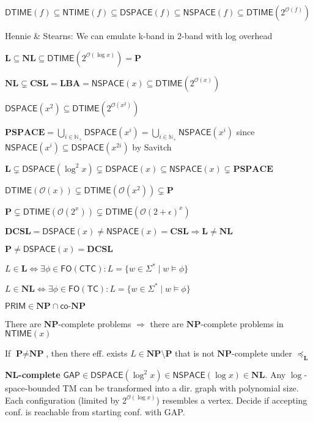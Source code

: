 \documentclass[10pt, twocolumn, parskip=never]{scrartcl}
\newcommand{\fat}[1]{\textbf{#1}}
\newcommand{\newthing}[1]{\fat{\faicon{caret-right} #1}}
\newcommand{\DTIME}[1]{\textsf{DTIME}(#1)}
\newcommand{\NTIME}[1]{\textsf{NTIME}(#1)}
\newcommand{\DSPACE}[1]{\textsf{DSPACE}(#1)}
\newcommand{\NSPACE}[1]{\textsf{NSPACE}(#1)}
\newcommand{\prob}[1]{\textsf{#1}}
\newcommand{\bigO}[1]{\mathcal{O}(#1)}
\newcommand{\reduce}{\preceq}
\newcommand{\lreduce}{\reduce_{\fat{L}}}
\begin{document}
\vfill

$\DTIME{f} \subseteq \NTIME{f} \subseteq \DSPACE{f} \subseteq \NSPACE{f} \subseteq \DTIME{2^{\bigO{f}}}$

Hennie \& Stearns: We can emulate k-band in 2-band with log overhead

$\fat{L} \subseteq \fat{NL} \subseteq \DTIME{2^{\mathcal{O}(\log{x})}} = \fat{P}$

$\fat{NL} \subsetneq \fat{CSL} = \fat{LBA} = \NSPACE{x} \subseteq \DTIME{2^{\mathcal{O}(x)}}$

$\DSPACE{x^2} \subseteq \DTIME{2^{\mathcal{O}(x^2)}}$

$\fat{PSPACE} = \bigcup_{i \in \mathbb{N}_+}{\DSPACE{x^i}} = \bigcup_{i \in \mathbb{N}_+}{\NSPACE{x^i}}$ since $\NSPACE{x^i} \subseteq \DSPACE{x^{2i}}$ by Savitch

$\fat{L} \subsetneq \DSPACE{\log^2{x}} \subsetneq \DSPACE{x} \subseteq \NSPACE{x} \subsetneq \fat{PSPACE}$

$\DTIME{\mathcal{O}(x)} \subsetneq \DTIME{\mathcal{O}(x^2)} \subsetneq \fat{P}$

$\fat{P} \subsetneq \DTIME{\mathcal{O}(2^x)} \subsetneq \DTIME{\mathcal{O}(2 + \epsilon)^x}$

$\fat{DCSL} = \DSPACE{x} \neq \NSPACE{x} = \fat{CSL} \Rightarrow \fat{L} \neq \fat{NL}$

$\fat{P} \neq \DSPACE{x} = \fat{DCSL}$

$L \in \fat{L} \Leftrightarrow \exists \phi \in \textsf{FO}(\textsf{CTC})\colon L = \{ w \in \Sigma^* \mid w \models \phi \}$

$L \in \fat{NL} \Leftrightarrow \exists \phi \in \textsf{FO}(\textsf{TC})\colon L = \{ w \in \Sigma^* \mid w \models \phi \}$

$\textsf{PRIM} \in \fat{NP} \cap \textsf{co-}\fat{NP}$

There are $\fat{NP}$-complete problems $\Rightarrow$ there are $\fat{NP}$-complete problems in $\NTIME{x}$

If $\fat{P} \neq \fat{NP}$, then there eff. exists $L \in \fat{NP} \setminus \fat{P}$ that is not $\fat{NP}$-complete under $\lreduce$

\vspace{0.5em}

\newthing{\fat{NL}-complete} $\prob{GAP} \in \DSPACE{\log^2{x}} \in \NSPACE{\log{x}} \in \fat{NL}$. Any $\log$-space-bounded TM can be transformed into a dir. graph with polynomial size. Each configuration (limited by $2^{\bigO{\log{x}}}$) resembles a vertex. Decide if accepting conf. is reachable from starting conf. with \prob{GAP}.
\end{document}
